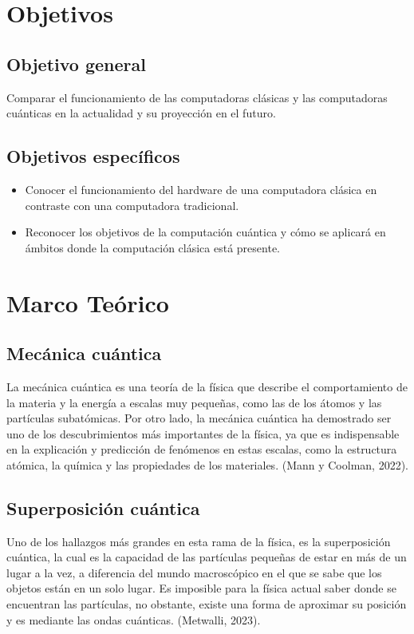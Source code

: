 \documentclass[twoside]{article}
\begin{document}
\newpage
\section{Objetivos}

\subsection{Objetivo general}
Comparar el funcionamiento de las computadoras clásicas y las computadoras cuánticas en la actualidad y su proyección en el futuro.

\subsection{Objetivos específicos}

\begin{itemize}
	\item Conocer el funcionamiento del hardware de una computadora clásica en contraste con una computadora tradicional.
	\item Reconocer los objetivos de la computación cuántica y cómo se aplicará en ámbitos donde la computación clásica está presente.
\end{itemize}

\newpage
\section{Marco Teórico}
\subsection{Mecánica cuántica} 
La mecánica cuántica es una teoría de la física que describe el comportamiento de la materia y la energía a escalas muy pequeñas, como las de los átomos y las partículas subatómicas. Por otro lado, la mecánica cuántica ha demostrado ser uno de los descubrimientos más importantes de la física, ya que es indispensable en la explicación y predicción de fenómenos en estas escalas, como la estructura atómica, la química y las propiedades de los materiales. (Mann y Coolman, 2022).

\subsection{Superposición cuántica} 
Uno de los hallazgos más grandes en esta rama de la física, es la superposición cuántica, la cual es la capacidad de las partículas pequeñas de estar en más de un lugar a la vez, a diferencia del mundo macroscópico en el que se sabe que los objetos están en un solo lugar. Es imposible para la física actual saber donde se encuentran las partículas, no obstante, existe una forma de aproximar su posición y es mediante las ondas cuánticas. (Metwalli, 2023).
\end{document}
